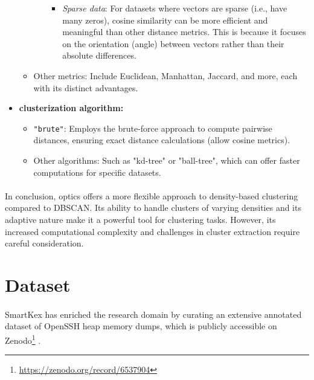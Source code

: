\begin{itemize}
\begin{itemize}
\begin{itemize}
\begin{itemize}
                            \item \textit{Sparse data}: For datasets where vectors are sparse (i.e., have many zeros), cosine similarity can be more efficient and meaningful than other distance metrics. This is because it focuses on the orientation (angle) between vectors rather than their absolute differences.
                        \end{itemize}
                    \end{itemize}

                    \item Other metrics: Include Euclidean, Manhattan, Jaccard, and more, each with its distinct advantages.
                \end{itemize}
                
                \item \textbf{clusterization algorithm:}
                \begin{itemize}
                    \item \texttt{"brute"}: Employs the brute-force approach to compute pairwise distances, ensuring exact distance calculations (allow cosine metrics).
                    \item Other algorithms: Such as "kd-tree" or "ball-tree", which can offer faster computations for specific datasets.
                \end{itemize}
            \end{itemize}

            \paragraph{}In conclusion, \acrshort{optics} offers a more flexible approach to density-based clustering compared to DBSCAN. Its ability to handle clusters of varying densities and its adaptive nature make it a powerful tool for clustering tasks. However, its increased computational complexity and challenges in cluster extraction require careful consideration.

\section{Dataset}\label{seq:background:dataset}
    \paragraph{}SmartKex has enriched the research domain by curating an extensive annotated dataset of OpenSSH heap memory dumps, which is publicly accessible on Zenodo\footnote{\url{https://zenodo.org/record/6537904}} \cite{fellicious_smartkex_2022}.

